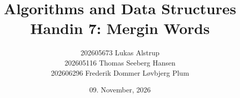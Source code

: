 %     

\RequirePackage{tikz}
\RequirePackage{xcolor}
\usetikzlibrary{calc,shadows,shadows.blur,shapes.geometric,shapes.misc,
  decorations.pathmorphing,decorations.text,fadings,patterns}

\title{Algorithms and Data Structures \\
  Handin 7: Mergin Words}

\author{
    202605673 Lukas Alstrup \\
    202605116 Thomas Seeberg Hansen \\
    202606296 Frederik Dommer Løvbjerg Plum
}

\date{09. November, 2026}


\newcommand{\burst}[4]{%
  \node[star, star points=14, star point ratio=1.35, minimum size=3.3cm,
        fill=#3, draw=black, line width=1.6pt, rotate=#2,
        drop shadow={shadow xshift=3pt, shadow yshift=-3pt, opacity=.6},
        align=center, font=\bfseries\sffamily\footnotesize, text width=1.9cm,
        inner sep=0pt] at (#1) {#4};}

\newcommand{\bead}[3]{%
  \node[circle, fill=#2, draw=white, line width=1.2pt, minimum size=8mm,
        font=\bfseries\sffamily\large, text=white,
        blur shadow={shadow blur steps=6}] at (#1) {#3};}

